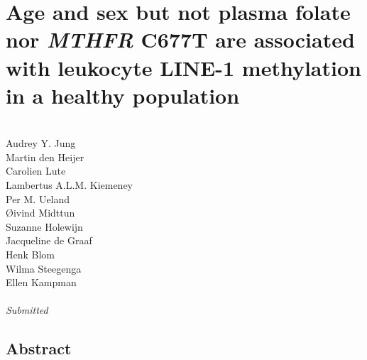 \chapter{Age and sex but not plasma folate nor \emph{MTHFR} C677T are associated with leukocyte LINE-1 methylation in a healthy population} 
\label{chap3_nbs} 


\quad\\

\noindent
Audrey Y. Jung\\
Martin den Heijer\\
Carolien Lute\\
Lambertus A.L.M. Kiemeney\\
Per M. Ueland\\
{\O}ivind Midttun\\
Suzanne Holewijn\\
Jacqueline de Graaf\\
Henk Blom\\
Wilma Steegenga\\
Ellen Kampman\\

\quad\\
\emph{Submitted}\\


\newpage

\section*{Abstract}


